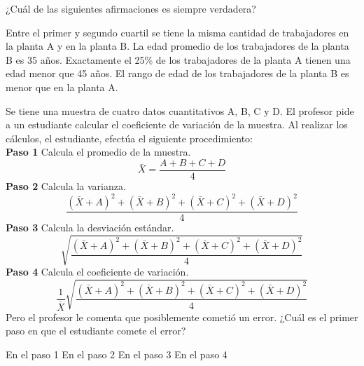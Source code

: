 \documentclass[sin nombre]{srs}
\begin{document}
\begin{preguntas}[after-item-skip=1cm]
\vspace*{10pt}
¿Cuál de las siguientes afirmaciones es siempre verdadera?
\begin{vertical}
\alternativa Entre el primer y segundo cuartil se tiene la misma cantidad de trabajadores en la planta A y en la planta B.
\alternativa La edad promedio de los trabajadores de la planta B es 35 años.
\alternativa Exactamente el 25\% de los trabajadores de la planta A tienen una edad menor que 45 años.
\alternativa El rango de edad de los trabajadores de la planta B es menor que en la planta A.
\end{vertical}

\pregunta Se tiene una muestra de cuatro datos cuantitativos A, B, C y D.
El profesor pide a un estudiante calcular el coeficiente de variación
de la muestra. Al realizar los cálculos, el estudiante, efectúa el
siguiente procedimiento:\\[5pt]
\textbf{Paso 1} Calcula el promedio de la muestra.
\begin{equation*} \bar{X} = \dfrac{A+B+C+D}{4} \end{equation*}
\textbf{Paso 2} Calcula la varianza.
\begin{equation*} \dfrac{(\bar{X}+A)^2+(\bar{X}+B)^2+(\bar{X}+C)^2+(\bar{X}+D)^2}{4} \end{equation*}
\textbf{Paso 3} Calcula la desviación estándar.
\begin{equation*} \sqrt{\dfrac{(\bar{X}+A)^2+(\bar{X}+B)^2+(\bar{X}+C)^2+(\bar{X}+D)^2}{4}} \end{equation*}
\textbf{Paso 4} Calcula el coeficiente de variación.
\begin{equation*} \dfrac{1}{\bar{X}}\sqrt{\dfrac{(\bar{X}+A)^2+(\bar{X}+B)^2+(\bar{X}+C)^2+(\bar{X}+D)^2}{4}} \end{equation*}
Pero el profesor le comenta que posiblemente cometió un error. ¿Cuál es el primer paso en que el estudiante comete el error?
\begin{vertical}
\alternativa En el paso 1
\alternativa En el paso 2
\alternativa En el paso 3
\alternativa En el paso 4
\end{vertical}


\end{preguntas}
\end{document}
